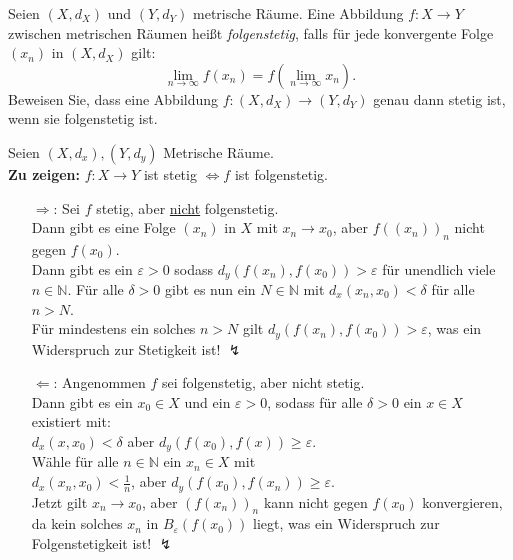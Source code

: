 \newpage
\begin{assignment}
  Seien \( (X,d_X) \) und \( (Y, d_Y) \) metrische Räume. Eine Abbildung \( f: X \to Y \) zwischen metrischen Räumen heißt \emph{folgenstetig}, falls für jede konvergente Folge \( (x_n) \) in \( (X, d_X) \) gilt:
  \begin{equation*}
    \lim_{n \to \infty} f(x_n) = f\left( \lim_{n \to \infty} x_n \right)\text{.}
  \end{equation*}
  Beweisen Sie, dass eine Abbildung \( f: (X, d_X) \to (Y, d_Y) \) genau dann stetig ist, wenn sie folgenstetig ist.
\end{assignment}
\begin{solution}
  Seien \( (X,d_x), (Y,d_y) \) Metrische Räume. \\
  \textbf{Zu zeigen:} \( f: X \to Y \) ist stetig \( \Leftrightarrow f \) ist folgenstetig.
  \begin{itemize}
    \item[\( \Rightarrow \):] Sei \( f \) stetig, aber \underline{nicht} folgenstetig. \\
    Dann gibt es eine Folge \( (x_n) \) in \( X \) mit \( x_n \to x_0 \), aber \( {f((x_n))}_n \) nicht gegen \( f(x_0) \). \\
    Dann gibt es ein \( \varepsilon > 0 \) sodass \( d_y(f(x_n),f(x_0)) > \varepsilon \) für unendlich viele \( n \in \mathbb{N} \). Für alle \( \delta > 0 \) gibt es nun ein \( N \in \mathbb{N} \) mit \( d_x(x_n,x_0) < \delta \) für alle \( n > N \). \\
    Für mindestens ein solches \( n > N \) gilt \( d_y(f(x_n),f(x_0)) > \varepsilon \), was ein Widerspruch zur Stetigkeit ist! \( \lightning \)
    
    \item[\( \Leftarrow \):] Angenommen \( f \) sei folgenstetig, aber nicht stetig. \\
    Dann gibt es ein \( x_0 \in X \) und ein \( \varepsilon > 0 \), sodass für alle \( \delta > 0 \) ein \( x \in X \) existiert mit: \\
    \( d_x(x,x_0) < \delta \) aber \( d_y(f(x_0),f(x)) \geq \varepsilon \). \\
    Wähle für alle \( n \in \mathbb{N} \) ein \( x_n \in X \) mit\\
    \( d_x(x_n,x_0) < \frac{1}{n} \), aber \( d_y(f(x_0), f(x_n)) \geq \varepsilon \). \\
    Jetzt gilt \( x_n \to x_0 \), aber \( {(f(x_n))}_n \) kann nicht gegen \( f(x_0) \) konvergieren, da kein solches \( x_n \) in \( B_{\varepsilon}(f(x_0)) \) liegt, was ein Widerspruch zur Folgenstetigkeit ist! \( \lightning \)
  \end{itemize}
\end{solution}




